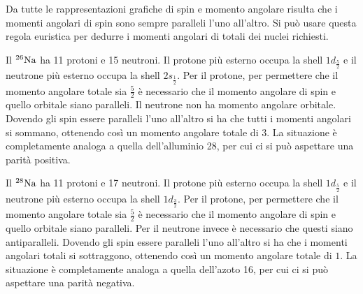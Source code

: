\documentclass[../main.tex]{subfiles}
\begin{document}
\begin{svol}
	Da tutte le rappresentazioni grafiche di spin e momento angolare risulta che i momenti angolari di spin sono sempre paralleli l'uno all'altro. Si può usare questa regola euristica per dedurre i momenti angolari di totali dei nuclei richiesti.
	
	Il $ ^{26}\mathrm{Na} $ ha 11 protoni e 15 neutroni. Il protone più esterno occupa la shell $ 1d_{\frac{5}{2}} $ e il neutrone più esterno occupa la shell $ 2s_{\frac{1}{2}} $. Per il protone, per permettere che il momento angolare totale sia $ \frac{5}{2} $ è necessario che il momento angolare di spin e quello orbitale siano paralleli. Il neutrone non ha momento angolare orbitale. Dovendo gli spin essere paralleli l'uno all'altro si ha che tutti i momenti angolari si sommano, ottenendo così un momento angolare totale di $ 3 $. La situazione è completamente analoga a quella dell'alluminio 28, per cui ci si può aspettare una parità positiva.
	
	Il $ ^{28}\mathrm{Na} $ ha 11 protoni e 17 neutroni. Il protone più esterno occupa la shell $ 1d_{\frac{5}{2}} $ e il neutrone più esterno occupa la shell $ 1d_{\frac{3}{2}} $. Per il protone, per permettere che il momento angolare totale sia $ \frac{5}{2} $ è necessario che il momento angolare di spin e quello orbitale siano paralleli. Per il neutrone invece è necessario che questi siano antiparalleli. Dovendo gli spin essere paralleli l'uno all'altro si ha che i momenti angolari totali si sottraggono, ottenendo così un momento angolare totale di $ 1 $. La situazione è completamente analoga a quella dell'azoto 16, per cui ci si può aspettare una parità negativa.
	
	\end{svol}
\end{document}
